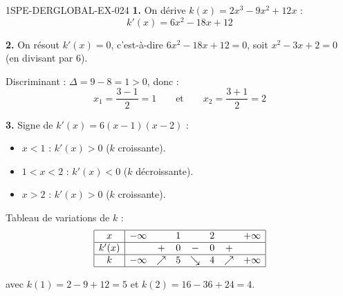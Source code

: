 \begin{corrige}{1SPE-DERGLOBAL-EX-024}
\textbf{1.} On dérive $k(x) = 2x^3 - 9x^2 + 12x$ :
\[
k'(x) = 6x^2 - 18x + 12
\]

\textbf{2.} On résout $k'(x) = 0$, c'est-à-dire $6x^2 - 18x + 12 = 0$, soit $x^2 - 3x + 2 = 0$ (en divisant par $6$).

Discriminant : $\Delta = 9 - 8 = 1 > 0$, donc :
\[
x_1 = \frac{3 - 1}{2} = 1 \qquad \text{et} \qquad x_2 = \frac{3 + 1}{2} = 2
\]

\textbf{3.} Signe de $k'(x) = 6(x-1)(x-2)$ :
\begin{itemize}
\item $x < 1$ : $k'(x) > 0$ ($k$ croissante).
\item $1 < x < 2$ : $k'(x) < 0$ ($k$ décroissante).
\item $x > 2$ : $k'(x) > 0$ ($k$ croissante).
\end{itemize}

Tableau de variations de $k$ :
\[
\begin{array}{|c|ccccccc|}
\hline
x & -\infty & & 1 & & 2 & & +\infty \\
\hline
k'(x) & & + & 0 & - & 0 & + & \\
\hline
k & -\infty & \nearrow & 5 & \searrow & 4 & \nearrow & +\infty \\
\hline
\end{array}
\]

avec $k(1) = 2 - 9 + 12 = 5$ et $k(2) = 16 - 36 + 24 = 4$.
\end{corrige}
